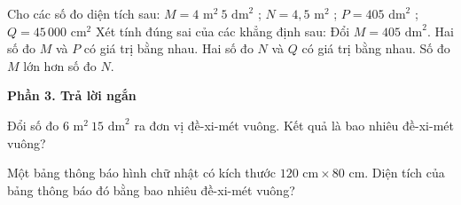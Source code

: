 \begin{ex} %
Cho các số đo diện tích sau:
$M = 4\text{ m}^2\ 5\text{ dm}^2$ ; $N = 4{,}5\text{ m}^2$ ; $P = 405\text{ dm}^2$ ; $Q = 45\,000\text{ cm}^2$
Xét tính đúng sai của các khẳng định sau:
\choiceTF
{\True Đổi $M = 405\text{ dm}^2$.}
{\True Hai số đo $M$ và $P$ có giá trị bằng nhau.}
{\True Hai số đo $N$ và $Q$ có giá trị bằng nhau.}
{Số đo $M$ lớn hơn số đo $N$.}
\end{ex}

\textbf{Phần 3. Trả lời ngắn}

\begin{ex} %
Đổi số đo $6\text{ m}^2\ 15\text{ dm}^2$ ra đơn vị đề-xi-mét vuông. Kết quả là bao nhiêu đề-xi-mét vuông?
\end{ex}

\begin{ex} %
Một bảng thông báo hình chữ nhật có kích thước $120\text{ cm} \times 80\text{ cm}$. Diện tích của bảng thông báo đó bằng bao nhiêu đề-xi-mét vuông?
\end{ex}

